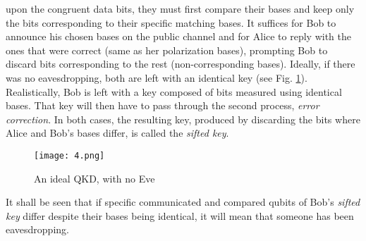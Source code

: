 upon the congruent data bits, they must first compare their bases and keep only the bits
corresponding to their specific matching bases. It suffices for Bob to announce his chosen bases on the
public channel and for Alice to reply with the ones that were correct (same as her polarization bases), 
prompting Bob to discard bits corresponding to the rest (non-corresponding bases). 
Ideally, if there was no eavesdropping, both are left with an identical key (see Fig. \ref{fig4}). 
Realistically, Bob is left with a key composed of bits measured using identical bases. 
That key will then have to pass through the second process, {\it error correction}. 
In both cases, the resulting key, produced by discarding the bits where Alice 
and Bob’s bases differ, is called the {\it sifted key}.
\begin{figure}[!h]
\centerline{\texttt{[image: 4.png]}}
\caption{An ideal QKD, with no Eve}
\label{fig4}
\end{figure}

It shall be seen that if specific communicated and compared qubits of Bob's {\it sifted key}
differ despite their bases being identical, it will mean that someone has been eavesdropping.

